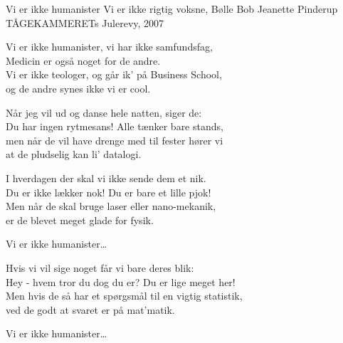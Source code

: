 \begin{song}{Vi er ikke humanister}
  {} %
  {Vi er ikke rigtig voksne, Bølle Bob} %
  {Jeanette Pinderup} %
  {TÅGEKAMMERETs Julerevy, 2007} %
  {\NotCCLIed} %

  \begin{SBChorus}
    Vi er ikke humanister, vi har ikke samfundsfag,\\
    Medicin er også noget for de andre.\\
    Vi er ikke teologer, og går ik’ på Business School,\\
    og de andre synes ikke vi er cool.
  \end{SBChorus}

  \begin{SBVerse}
    Når jeg vil ud og danse hele natten, siger de:\\
    Du har ingen rytmesans! Alle tænker bare stands,\\
    men når de vil have drenge med til fester hører vi\\
    at de pludselig kan li’ datalogi.
  \end{SBVerse}

  \begin{SBVerse}
    I hverdagen der skal vi ikke sende dem et nik.\\
    Du er ikke lækker nok! Du er bare et lille pjok!\\
    Men når de skal bruge laser eller nano-mekanik,\\
    er de blevet meget glade for fysik.
  \end{SBVerse}

  \begin{SBChorus}
    Vi er ikke humanister\ldots
  \end{SBChorus}

  \begin{SBVerse}
    Hvis vi vil sige noget får vi bare deres blik:\\
    Hey - hvem tror du dog du er? Du er lige meget her!\\
    Men hvis de så har et spørgsmål til en vigtig statistik,\\
    ved de godt at svaret er på mat’matik.
  \end{SBVerse}

  \begin{SBChorus}
    Vi er ikke humanister\ldots
  \end{SBChorus}
\end{song}
